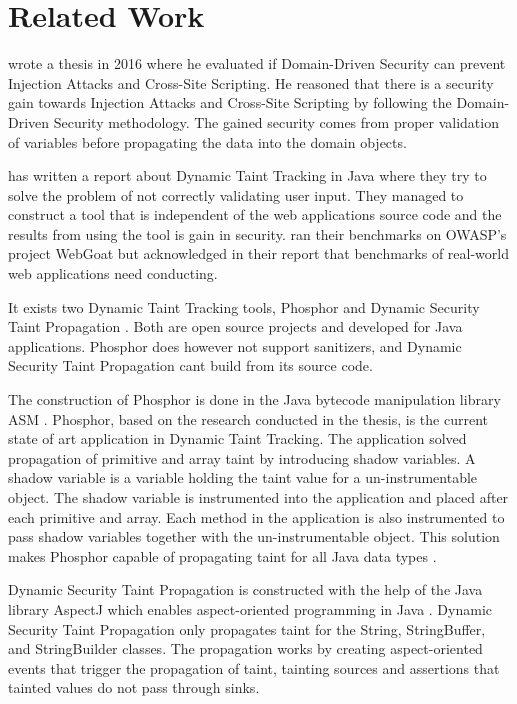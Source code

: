 \chapter{Related Work}
\textcite{Stendahl2016} wrote a thesis in 2016 where he evaluated if Domain-Driven Security can prevent Injection Attacks and Cross-Site Scripting. He reasoned that there is a security gain towards Injection Attacks and Cross-Site Scripting by following the Domain-Driven Security methodology. The gained security comes from proper validation of variables before propagating the data into the domain objects.

\textcite{Haldar} has written a report about Dynamic Taint Tracking in Java where they try to solve the problem of not correctly validating user input. They managed to construct a tool that is independent of the web applications source code and the results from using the tool is gain in security. \textcite{Haldar} ran their benchmarks on OWASP’s project WebGoat \parencite{webgoat} but acknowledged in their report that benchmarks of real-world web applications need conducting.

It exists two Dynamic Taint Tracking tools, Phosphor \parencite{phosphor} and Dynamic Security Taint Propagation \parencite{securityTaint}. Both are open source projects and developed for Java applications. Phosphor does however not support sanitizers, and Dynamic Security Taint Propagation cant build from its source code.

The construction of Phosphor \parencite{phosphor} is done in the Java bytecode manipulation library ASM \parencite{asm}. Phosphor, based on the research conducted in the thesis, is the current state of art application in Dynamic Taint Tracking. The application solved propagation of primitive and array taint by introducing shadow variables. A shadow variable is a variable holding the taint value for a un-instrumentable object. The shadow variable is instrumented into the application and placed after each primitive and array. Each method in the application is also instrumented to pass shadow variables together with the un-instrumentable object. This solution makes Phosphor capable of propagating taint for all Java data types \parencite{BellJ.2014PIdd}.

Dynamic Security Taint Propagation \parencite{securityTaint} is constructed with the help of the Java library AspectJ which enables aspect-oriented programming in Java \parencite{aspectj}. Dynamic Security Taint Propagation only propagates taint for the String, StringBuffer, and StringBuilder classes. The propagation works by creating aspect-oriented events that trigger the propagation of taint, tainting sources and assertions that tainted values do not pass through sinks.